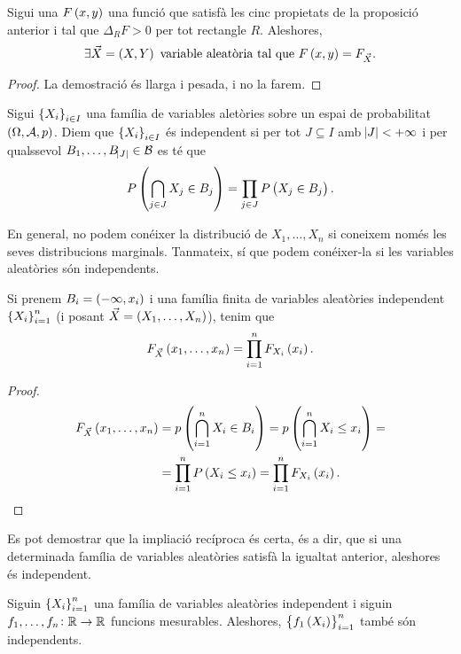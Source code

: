 \begin{prop}
    Sigui una $F\left( x,y\right)$ una funció que satisfà les cinc propietats de la proposició anterior i tal que $\Delta_RF>0$ per tot rectangle $R$. Aleshores,
    \[
        \exists \vec{X}=\left( X,Y\right) \text{ variable aleatòria tal que } F\left( x,y\right) = F_{\vec{X}}.
    \]
\end{prop}
\begin{proof}
    La demostració és llarga i pesada, i no la farem.
\end{proof}
\begin{defi}
    Sigui $\left\{ X_i\right\}_{i\in I}$ una família de variables aletòries sobre un espai de probabilitat $\left(\Omega,\mathcal{A},p\right)$. Diem que $\left\{ X_i\right\}_{i\in I}$ és independent si per tot $J\subseteq I$ amb $\abs{J}<+\infty$ i per qualssevol $B_1,\dots,B_{\abs{J}}\in\mathcal{B}$ es té que
    \[
        P\left(\bigcap_{j\in J}X_j\in B_j\right) = \prod_{j\in J} P\left( X_j\in B_j\right).
    \]
\end{defi}
En general, no podem conéixer la distribució de $X_1,\dots,X_n$ si coneixem només les seves distribucions marginals. Tanmateix, sí que podem conéixer-la si les variables aleatòries són independents.
\begin{prop}
    Si prenem $B_i=\left(-\infty,x_i\right)$ i una família finita de variables aleatòries independent $\left\{ X_i\right\}_{i=1}^n$ (i posant $\vec{X}=\left( X_1,\dots,X_n\right)$), tenim que
    \[
        F_{\vec{X}}\left( x_1,\dots,x_n\right) = \prod_{i=1}^n F_{X_i}\left( x_i\right).
    \]
\end{prop}
\begin{proof}
    \begin{align*}
        F_{\vec{X}}\left( x_1,\dots,x_n\right) &= p\left( \bigcap_{i=1}^n X_i\in B_i\right) =p\left( \bigcap_{i=1}^n X_i\leq x_i\right) =\\
        &= \prod_{i=1}^n P\left( X_i\leq x_i\right) = \prod_{i=1}^n F_{X_i}\left( x_i\right).
    \end{align*}
\end{proof}
\begin{obs}
    Es pot demostrar que la impliació recíproca és certa, és a dir, que si una determinada família de variables aleatòries satisfà la igualtat anterior, aleshores és independent.
\end{obs}
\begin{obs}
    Siguin $\left\{ X_i\right\}_{i=1}^n$ una família de variables aleatòries independent i siguin $f_1,\dots,f_n\colon \mathbb{R}\to\mathbb{R}$ funcions mesurables. Aleshores, $\left\{ f_1\left( X_i\right)\right\}_{i=1}^n$ també són independents.
\end{obs}
